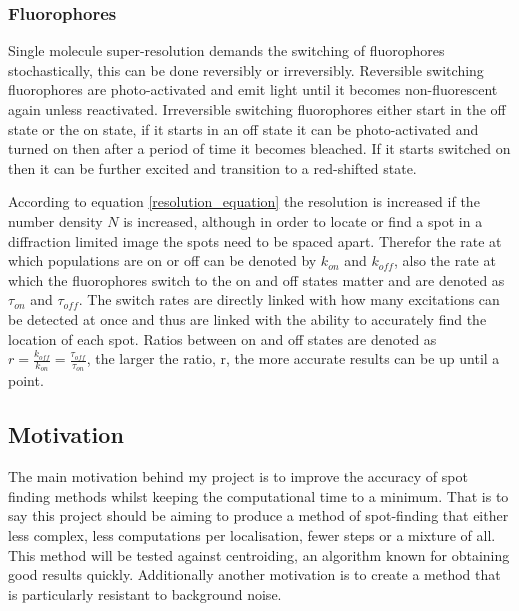 \documentclass[aps,pra,a4paper,nofootinbib,onecolumn,tightenlines,longbibliography,12pt,amsfonts,amssymb,amsmath,floatfix]{revtex4-2} %
\begin{document}
   \subsubsection{Fluorophores} %
   \label{ssub:Fluorophores}
   
   Single molecule super-resolution demands the switching of fluorophores
   stochastically, this can be done reversibly or irreversibly. Reversible switching fluorophores
   are photo-activated and emit light until it becomes non-fluorescent again unless reactivated.  
   Irreversible switching fluorophores either start in the off state or the on state, if it 
   starts in an off state it can be photo-activated and turned on then after a period of 
   time it becomes bleached. If it starts switched on then it can be further excited 
   and transition to a red-shifted state.\cite{van2011single}

   According to equation \ref{resolution_equation} the resolution is increased 
   if the number density $N$ is increased, although in order to locate or find a spot 
   in a diffraction limited image the spots need to be spaced apart. 
   Therefor the rate at which populations are on or off can be denoted by $k_{on}$ and 
   $k_{off}$, also the rate at which the fluorophores switch to the on and off states matter 
   and are denoted as $\tau_{on}$ and $\tau_{off}$. The switch rates are directly linked with 
   how many excitations can be detected at once and thus are linked with the ability to 
   accurately find the location of each spot. Ratios between on and off states are denoted as 
   $r=\frac{k_{off}}{k_{on}}=\frac{\tau_{off}}{\tau_{on}}$, the larger the ratio, r, the more 
   accurate results can be up until a point.
   

  \subsection{Motivation} %
  \label{sub:Motivation}
  

  The main motivation behind my project is to improve the accuracy of spot finding methods 
  whilst keeping the computational time to a minimum. That is to say this project should be aiming to
  produce a method of spot-finding that either less complex, less computations
  per localisation, fewer steps or a mixture of all. This method will be tested against 
  centroiding, an algorithm known for obtaining good results quickly. Additionally another
  motivation is to create a method that is particularly resistant to background noise. 
\end{document}
